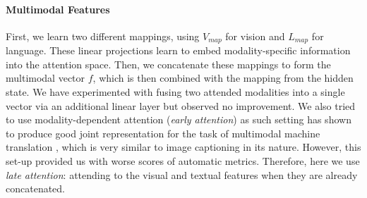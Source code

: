 \documentclass[11pt,a4paper]{article}
\newcommand{\kibitz}[2]{\ifnum\Comments=1\textcolor{#1}{#2}\fi}
\newcommand{\nikolai}[1]{\kibitz{red}  {[Nikolai: #1]}}
\newcommand{\R}{\mathbb{R}}
\begin{document}

\paragraph{Multimodal Features}
First, we learn two different mappings, using $V_{map}$ for vision and $L_{map}$ for language.
These linear projections learn to embed modality-specific information into the attention space.
Then, we concatenate these mappings to form the multimodal vector $f$, which is then combined with the mapping from the hidden state.
We have experimented with fusing two attended modalities into a single vector via an additional linear layer but observed no improvement.
We also tried to use modality-dependent attention (\textit{early attention}) as such setting has shown to produce good joint representation for the task of multimodal machine translation \cite{Caglayan2016,Caglayan2019}, which is very similar to image captioning in its nature.
However, this set-up provided us with worse scores of automatic metrics.
Therefore, here we use \textit{late attention}: attending to the visual and textual features when they are already concatenated.
\end{document}
